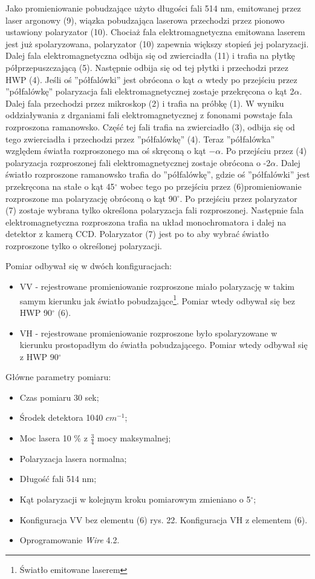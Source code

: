 Jako promieniowanie pobudzające użyto długości fali 514 nm, emitowanej przez laser argonowy (9), wiązka pobudzająca laserowa przechodzi przez pionowo ustawiony polaryzator (10). Chociaż fala elektromagnetyczna emitowana laserem jest już spolaryzowana, polaryzator (10) zapewnia większy stopień jej polaryzacji. Dalej fala elektromagnetyczna odbija się od zwierciadła (11) i trafia na płytkę półprzepuszczającą (5). Następnie odbija się od tej płytki i przechodzi przez HWP (4). Jeśli oś ''półfalówki'' jest obrócona o kąt $\alpha$ wtedy po przejściu przez ''półfalówkę'' polaryzacja fali elektromagnetycznej zostaje przekręcona o kąt 2$\alpha$. Dalej fala przechodzi przez mikroskop (2) i trafia na próbkę (1). W wyniku oddziaływania z drganiami fali elektromagnetycznej z fononami powstaje fala rozproszona ramanowsko. Część tej fali trafia na zwierciadło (3), odbija się od tego zwierciadła i przechodzi przez ''półfalówkę'' (4). Teraz ''półfalówka'' względem światła rozproszonego ma oś skręconą o kąt $-\alpha$. Po przejściu przez (4) polaryzacja rozproszonej fali elektromagnetycznej zostaje obrócona o -2$\alpha$. Dalej światło rozproszone ramanowsko trafia do ''półfalówkę'', gdzie oś ''półfalówki'' jest przekręcona na stałe o kąt 45$^\circ$ wobec tego po przejściu przez (6)promieniowanie rozproszone ma polaryzację obróconą o kąt 90$^\circ$. Po przejściu przez polaryzator (7) zostaje wybrana tylko określona polaryzacja fali rozproszonej. Następnie fala elektromagnetyczna rozproszona trafia na układ monochromatora i dalej na detektor z kamerą CCD. Polaryzator (7) jest po to aby wybrać światło rozproszone tylko o określonej polaryzacji.

Pomiar odbywał się w dwóch konfiguracjach:
\begin{itemize}
	\item VV - rejestrowane promieniowanie rozproszone miało polaryzację w takim samym kierunku jak światło pobudzające\footnote{Światło emitowane laserem}. Pomiar wtedy odbywał się bez HWP 90$^{\circ}$ (6).
	\item VH - rejestrowane promieniowanie rozproszone było spolaryzowane w kierunku prostopadłym do światła pobudzającego. Pomiar wtedy odbywał się z HWP 90$^{\circ}$
\end{itemize} 

Główne parametry pomiaru:
\begin{itemize}
	\item Czas pomiaru 30 sek;
	\item Środek detektora 1040 $cm^{-1}$;
	\item Moc lasera 10 \% z $\frac{3}{4}$ mocy maksymalnej;
	\item Polaryzacja lasera normalna;
	\item Długość fali 514 nm;
	\item Kąt polaryzacji w kolejnym kroku pomiarowym zmieniano o 5$^{\circ}$;
	\item Konfiguracja VV bez elementu (6) rys. 22. Konfiguracja VH z elementem (6).
	\item Oprogramowanie \textit{Wire} 4.2.
\end{itemize}

